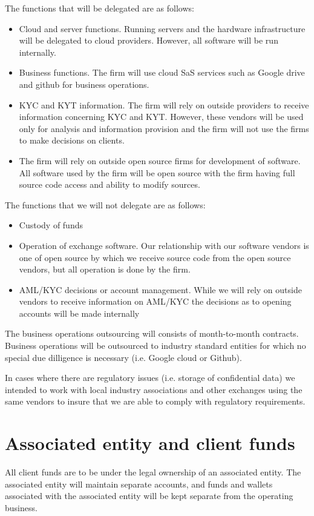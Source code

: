 The functions that will be delegated are as follows:
\begin{itemize}
  \item Cloud and server functions.  Running servers and the hardware
    infrastructure will be delegated to cloud providers.  However, all
    software will be run internally.
 \item Business functions.  The firm will use cloud SaS services such
   as Google drive and github for business operations.
 \item KYC and KYT information.  The firm will rely on outside
   providers to receive information concerning KYC and KYT.  However,
   these vendors will be used only for analysis and information
   provision and the firm will not use the firms to make decisions on
   clients.
\item The firm will rely on outside open source firms for development
  of software.  All software used by the firm will be open source with
  the firm having full source code access and ability to modify sources.
\end{itemize}

The functions that we will not delegate are as follows:
\begin{itemize}
\item Custody of funds
  \item Operation of exchange software.  Our relationship with our
    software vendors is one of open source by which we receive source
    code from the open source vendors, but all operation is done by
    the firm.
 \item AML/KYC decisions or account management.  While we will rely on
   outside vendors to receive information on AML/KYC the decisions as
   to opening accounts will be made internally
\end{itemize}

The business operations outsourcing will consists of month-to-month
contracts.  Business operations will be outsourced to industry
standard entities for which no special due dilligence is necessary
(i.e. Google cloud or Github).

In cases where there are regulatory issues (i.e. storage of
confidential data) we intended to work with local industry
associations and other exchanges using the same vendors to insure that
we are able to comply with regulatory requirements.

\section{Associated entity and client funds}
All client funds are to be under the legal ownership of an associated
entity.  The associated entity will maintain separate accounts, and
funds and wallets associated with the associated entity will be kept
separate from the operating business.

